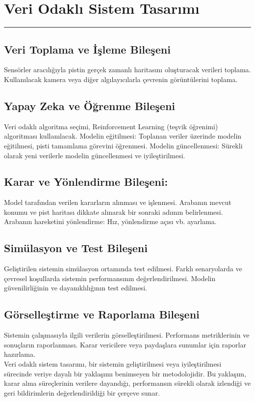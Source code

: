 \documentclass{article}
\begin{document}
\newpage

\section{Veri Odaklı Sistem Tasarımı}
\rule{\textwidth}{0.5pt}

\subsection{Veri Toplama ve İşleme Bileşeni}
Sensörler aracılığıyla pistin gerçek zamanlı haritasını oluşturacak verileri toplama.
Kullanılacak kamera veya diğer algılayıcılarla çevrenin görüntülerini toplama.
\subsection{Yapay Zeka ve Öğrenme Bileşeni}
Veri odaklı algoritma seçimi, Reinforcement Learning (teşvik öğrenimi) algoritması kullanılacak.
Modelin eğitilmesi: Toplanan veriler üzerinde modelin eğitilmesi, pisti tamamlama görevini öğrenmesi.
Modelin güncellenmesi: Sürekli olarak yeni verilerle modelin güncellenmesi ve iyileştirilmesi.
\subsection{Karar ve Yönlendirme Bileşeni:}
Model tarafından verilen kararların alınması ve işlenmesi.
Arabanın mevcut konumu ve pist haritası dikkate alınarak bir sonraki adımın belirlenmesi.
Arabanın hareketini yönlendirme: Hız, yönlendirme açısı vb. ayarlama.
\subsection{Simülasyon ve Test Bileşeni}
Geliştirilen sistemin simülasyon ortamında test edilmesi.
Farklı senaryolarda ve çevresel koşullarda sistemin performansının değerlendirilmesi.
Modelin güvenilirliğinin ve dayanıklılığının test edilmesi.
\subsection{Görselleştirme ve Raporlama Bileşeni}
Sistemin çalışmasıyla ilgili verilerin görselleştirilmesi.
Performans metriklerinin ve sonuçların raporlanması.
Karar vericilere veya paydaşlara sunumlar için raporlar hazırlama.\\[15pt]

\noindent Veri odaklı sistem tasarımı, bir sistemin geliştirilmesi veya iyileştirilmesi sürecinde veriye dayalı bir yaklaşımı benimseyen bir metodolojidir. Bu yaklaşım, karar alma süreçlerinin verilere dayandığı, performansın sürekli olarak izlendiği ve geri bildirimlerin değerlendirildiği bir çerçeve sunar.
\end{document}
